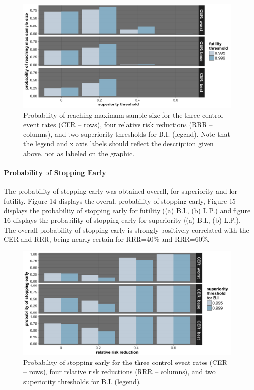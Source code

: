 \documentclass[]{article}
\let\oldparagraph\paragraph
\renewcommand{\paragraph}[1]{\oldparagraph{#1}\mbox{}}
\begin{document}
\begin{figure}
  \caption{Probability of reaching maximum sample size for the three control event rates (CER – rows), four relative
  risk reductions (RRR – columns), and two superiority thresholds for B.I. (legend). Note that the legend and x axis labels should reflect the description given above, not as labeled on the graphic.}
  \includegraphics{../plots/3arm/reachmax_3arm.png}
\end{figure}

\hypertarget{probability-of-stopping-early-1}{%
\paragraph{Probability of Stopping
Early}\label{probability-of-stopping-early-1}}

The probability of stopping early was obtained overall, for superiority
and for futility. Figure 14 displays the overall probability of stopping
early, Figure 15 displays the probability of stopping early for futility
((a) B.I., (b) L.P.) and figure 16 displays the probability of stopping
early for superiority ((a) B.I., (b) L.P.). The overall probability of
stopping early is strongly positively correlated with the CER and RRR,
being nearly certain for RRR=40\% and RRR=60\%.

\begin{figure}
  \caption{Probability of stopping early for the three control event rates (CER – rows), four relative risk reductions
  (RRR – columns), and two superiority thresholds for B.I. (legend).}
  \includegraphics{../plots/3arm/early.png}
\end{figure}
\end{document}

